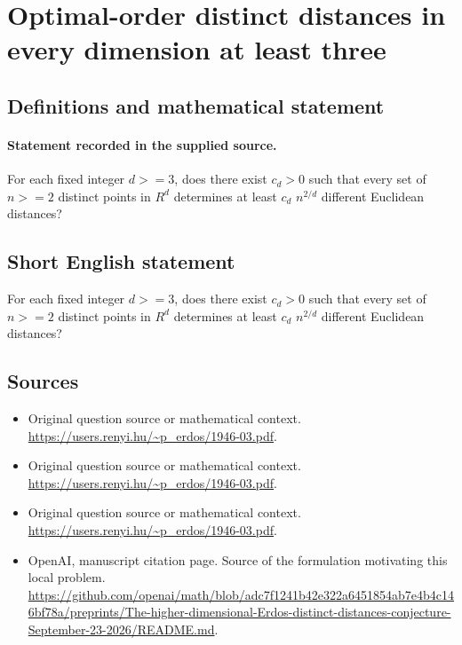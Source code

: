 \documentclass[11pt]{article}
\begin{document}
\section*{Optimal-order distinct distances in every dimension at least three}\label{30007093}
\subsection{Definitions and mathematical statement}
\paragraph{Statement recorded in the supplied source.}
For each fixed integer $d>=3$, does there exist $c_d>0$ such that every set of $n>=2$ distinct points in $R^d$ determines at least $c_d$ $n^{2/d}$ different Euclidean distances?
\subsection{Short English statement}
For each fixed integer $d>=3$, does there exist $c_d>0$ such that every set of $n>=2$ distinct points in $R^d$ determines at least $c_d$ $n^{2/d}$ different Euclidean distances?
\subsection{Sources}
\begin{itemize}
\item[S1] Original question source or mathematical context.
\url{https://users.renyi.hu/~p_erdos/1946-03.pdf}.
\item[S2] Original question source or mathematical context.
\url{https://users.renyi.hu/~p_erdos/1946-03.pdf}.
\item[S3] Original question source or mathematical context.
\url{https://users.renyi.hu/~p_erdos/1946-03.pdf}.
\item[S4] OpenAI, manuscript citation page. Source of the formulation motivating this local problem.
\url{https://github.com/openai/math/blob/adc7f1241b42e322a6451854ab7e4b4c146bf78a/preprints/The-higher-dimensional-Erdos-distinct-distances-conjecture-September-23-2026/README.md}.
\end{itemize}
\end{document}
